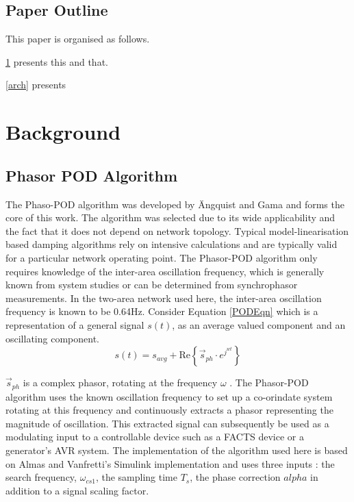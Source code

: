 \documentclass[conference]{IEEEtran}
\begin{document}
\subsection{Paper Outline}
This paper is organised as follows.

\ref{background} presents this and that.

\ref{arch} presents 

\section{Background}\label{background}

\subsection{Phasor POD Algorithm}
The Phaso-POD algorithm was developed by \"{A}ngquist and Gama\cite{PhasorPOD} and forms the core of this work. The algorithm was selected due to its wide applicability and the fact that it does not depend on network topology. Typical model-linearisation based damping algorithms rely on intensive calculations and are typically valid for a particular network operating point. The Phasor-POD algorithm only requires knowledge of the inter-area oscillation frequency, which is generally known from system studies or can be determined from synchrophasor measurements. In the two-area network used here, the inter-area oscillation frequency is known to be 0.64Hz. Consider Equation \ref{PODEqn} which is a representation of a general signal $s(t)$, as an average valued component and an oscillating component.\\

\begin{equation}
s(t)={s}_{avg}+\mathrm{Re}\left\{{\stackrel{\to }{s}}_{ph}\cdot {e}^{{j}^{wt}}\right\}
\label{PODEqn}
\end{equation}

$\stackrel{\to }{s}_{ph}$ is a complex phasor, rotating at the frequency $\omega$ \cite{PhasorPOD}. The Phasor-POD algorithm uses the known oscillation frequency to set up a co-orindate system rotating at this frequency and continuously extracts a phasor representing the magnitude of oscillation\cite{PhasorPOD}. This extracted signal can subsequently be used as a modulating input to a controllable device such as a FACTS device or a generator's AVR system. The implementation of the algorithm used here is based on Almas and Vanfretti's Simulink implementation \cite{PhasorPODImplement} and uses three inputs : the search frequency, $\omega_{cs1}$, the sampling time $T_{s}$, the phase correction $alpha$ in addition to a signal scaling factor.\\
\end{document}
